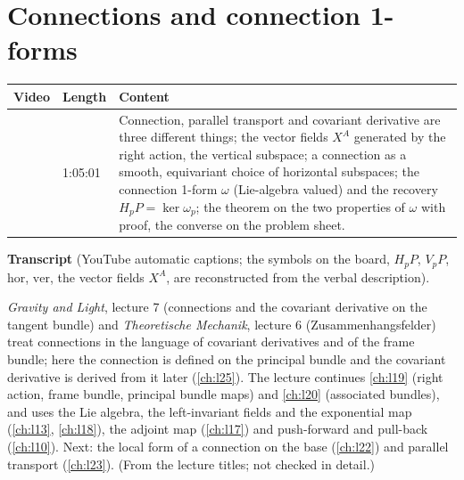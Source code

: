 \chapter{Connections and connection 1-forms}\label{ch:l21}
\providecommand{\lact}{\mathbin{\triangleright}}
\providecommand{\ract}{\mathbin{\triangleleft}}
\begin{paracol}{2}

\begin{sources}
\begin{tabularx}{\linewidth}{@{}l l L@{}}
\toprule
\textbf{Video} & \textbf{Length} & \textbf{Content}\\
\midrule
{} & 1:05:01 & Connection, parallel transport and covariant derivative are three different things; the vector fields $X^A$ generated by the right action, the vertical subspace; a connection as a smooth, equivariant choice of horizontal subspaces; the connection 1-form $\omega$ (Lie-algebra valued) and the recovery $H_pP=\ker\omega_p$; the theorem on the two properties of $\omega$ with proof, the converse on the problem sheet.\\
\bottomrule
\end{tabularx}

\smallskip
\textbf{Transcript}  (YouTube automatic captions; the symbols on the board, $H_pP$, $V_pP$, $\mathrm{hor}$, $\mathrm{ver}$, the vector fields $X^A$, are reconstructed from the verbal description).
\end{sources}

\begin{reading}
\emph{Gravity and Light}, lecture 7 (connections and the covariant derivative on the tangent bundle) and \emph{Theoretische Mechanik}, lecture 6 (Zusammenhangsfelder) treat connections in the language of covariant derivatives and of the frame bundle; here the connection is defined on the principal bundle and the covariant derivative is derived from it later (\cref{ch:l25}). The lecture continues \cref{ch:l19} (right action, frame bundle, principal bundle maps) and \cref{ch:l20} (associated bundles), and uses the Lie algebra, the left-invariant fields and the exponential map (\cref{ch:l13}, \cref{ch:l18}), the adjoint map (\cref{ch:l17}) and push-forward and pull-back (\cref{ch:l10}). Next: the local form of a connection on the base (\cref{ch:l22}) and parallel transport (\cref{ch:l23}). (From the lecture titles; not checked in detail.)
\end{reading}


\end{paracol}
